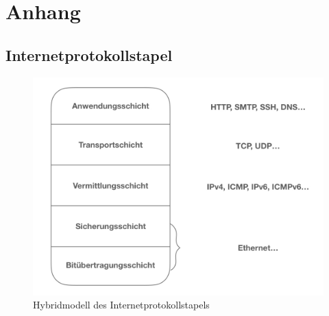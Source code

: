 \chapter{Anhang}
\section{Internetprotokollstapel}
\label{A1}
\begin{figure}[h]
\includegraphics[width=\linewidth]{protstap}
\caption{Hybridmodell des Internetprotokollstapels}
\end{figure}